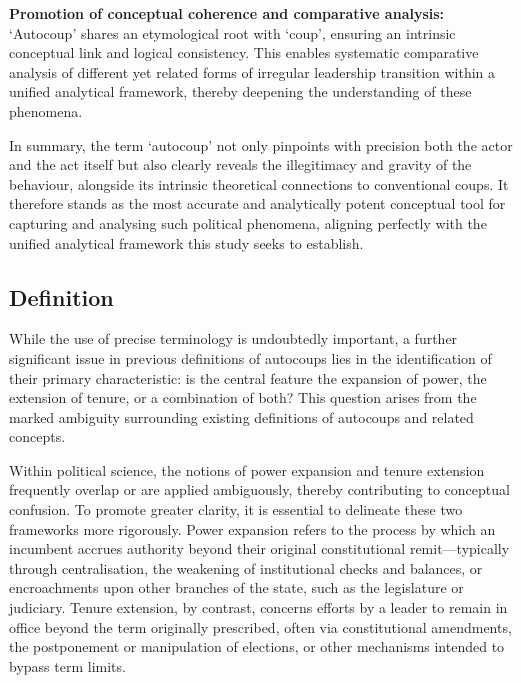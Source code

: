 \documentclass[
  12pt,
]{report}
\begin{document}
\textbf{Promotion of conceptual coherence and comparative analysis:}
`Autocoup' shares an etymological root with `coup', ensuring an
intrinsic conceptual link and logical consistency. This enables
systematic comparative analysis of different yet related forms of
irregular leadership transition within a unified analytical framework,
thereby deepening the understanding of these phenomena.

In summary, the term `autocoup' not only pinpoints with precision both
the actor and the act itself but also clearly reveals the illegitimacy
and gravity of the behaviour, alongside its intrinsic theoretical
connections to conventional coups. It therefore stands as the most
accurate and analytically potent conceptual tool for capturing and
analysing such political phenomena, aligning perfectly with the unified
analytical framework this study seeks to establish.

\subsection*{Definition}\label{sec-definition}

While the use of precise terminology is undoubtedly important, a further
significant issue in previous definitions of autocoups lies in the
identification of their primary characteristic: is the central feature
the expansion of power, the extension of tenure, or a combination of
both? This question arises from the marked ambiguity surrounding
existing definitions of autocoups and related concepts.

Within political science, the notions of power expansion and tenure
extension frequently overlap or are applied ambiguously, thereby
contributing to conceptual confusion. To promote greater clarity, it is
essential to delineate these two frameworks more rigorously. Power
expansion refers to the process by which an incumbent accrues authority
beyond their original constitutional remit---typically through
centralisation, the weakening of institutional checks and balances, or
encroachments upon other branches of the state, such as the legislature
or judiciary. Tenure extension, by contrast, concerns efforts by a
leader to remain in office beyond the term originally prescribed, often
via constitutional amendments, the postponement or manipulation of
elections, or other mechanisms intended to bypass term limits.
\end{document}
